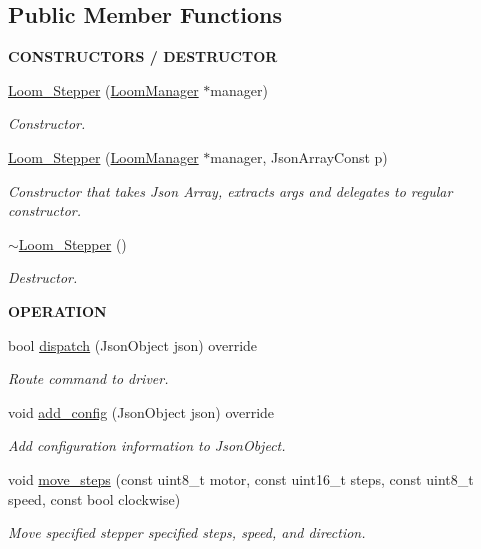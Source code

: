 \subsection*{Public Member Functions}
\begin{Indent}{\bf C\+O\+N\+S\+T\+R\+U\+C\+T\+O\+RS / D\+E\+S\+T\+R\+U\+C\+T\+OR}\par
\begin{DoxyCompactItemize}
\item 
\hyperlink{class_loom___stepper_ac9847c8759e5409bc3083ed6bc979d86}{Loom\+\_\+\+Stepper} (\hyperlink{class_loom_manager}{Loom\+Manager} $\ast$manager)
\begin{DoxyCompactList}\small\item\em Constructor. \end{DoxyCompactList}\item 
\hyperlink{class_loom___stepper_a1d104675960461e390b21a4f8494fd71}{Loom\+\_\+\+Stepper} (\hyperlink{class_loom_manager}{Loom\+Manager} $\ast$manager, Json\+Array\+Const p)
\begin{DoxyCompactList}\small\item\em Constructor that takes Json Array, extracts args and delegates to regular constructor. \end{DoxyCompactList}\item 
\hyperlink{class_loom___stepper_a927d6418e8900ffde9d2801f03741018}{$\sim$\+Loom\+\_\+\+Stepper} ()
\begin{DoxyCompactList}\small\item\em Destructor. \end{DoxyCompactList}\end{DoxyCompactItemize}
\end{Indent}
\begin{Indent}{\bf O\+P\+E\+R\+A\+T\+I\+ON}\par
\begin{DoxyCompactItemize}
\item 
bool \hyperlink{class_loom___stepper_ae2500cbc8029c5b3878d5465dfc01c22}{dispatch} (Json\+Object json) override
\begin{DoxyCompactList}\small\item\em Route command to driver. \end{DoxyCompactList}\item 
void \hyperlink{class_loom___stepper_a5413b50ce475e1f14773c3dfa8af0b59}{add\+\_\+config} (Json\+Object json) override
\begin{DoxyCompactList}\small\item\em Add configuration information to Json\+Object. \end{DoxyCompactList}\item 
void \hyperlink{class_loom___stepper_a691c9d6fd64d5ffe72b2e2ece42a02c9}{move\+\_\+steps} (const uint8\+\_\+t motor, const uint16\+\_\+t steps, const uint8\+\_\+t speed, const bool clockwise)
\begin{DoxyCompactList}\small\item\em Move specified stepper specified steps, speed, and direction. \end{DoxyCompactList}\end{DoxyCompactItemize}
\end{Indent}
